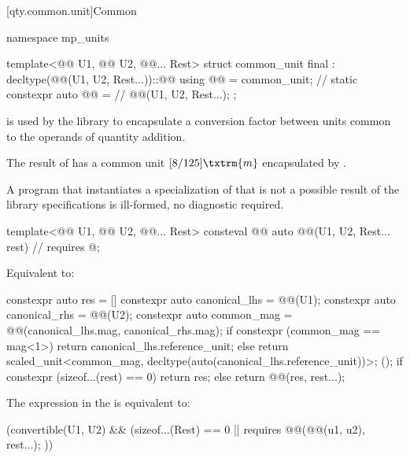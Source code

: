 [qty.common.unit]{Common}

\begin{codeblock}
namespace mp_units {

template<@@ U1, @@ U2, @@... Rest>
struct common_unit final : decltype(@@(U1{}, U2{}, Rest{}...))::@@
{
  using @@ = common_unit;       // \expos
  static constexpr auto @@ =  // \expos
    @@(U1{}, U2{}, Rest{}...);
};

}
\end{codeblock}

\pnum
{} is used by the library
to encapsulate a conversion factor between units
common to the operands of quantity addition.
\begin{example}
The result of 
has a common unit $[8/125] \txtrm{ m}$
encapsulated by .
\end{example}
A program that instantiates a specialization of 
that is not a possible result of the library specifications
is ill-formed, no diagnostic required.

\begin{itemdecl}
template<@@ U1, @@ U2, @@... Rest>
consteval @@ auto @@(U1, U2, Rest... rest)  // \expos
  requires @\seebelownc@;
\end{itemdecl}

\begin{itemdescr}
\pnum
\effects
Equivalent to:
\begin{codeblock}
constexpr auto res = [] {
  constexpr auto canonical_lhs = @@(U1{});
  constexpr auto canonical_rhs = @@(U2{});
  constexpr auto common_mag = @@(canonical_lhs.mag, canonical_rhs.mag);
  if constexpr (common_mag == mag<1>)
    return canonical_lhs.reference_unit;
  else
    return scaled_unit<common_mag, decltype(auto(canonical_lhs.reference_unit))>{};
}();
if constexpr (sizeof...(rest) == 0)
  return res;
else
  return @@(res, rest...);
\end{codeblock}

\pnum
\remarks
The expression in the  is equivalent to:
\begin{codeblock}
(convertible(U1{}, U2{}) && (sizeof...(Rest) == 0 || requires {
   @@(@@(u1, u2), rest...);
 }))
\end{codeblock}
\end{itemdescr}

